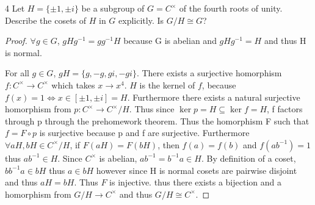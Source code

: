 \documentclass{article}
\begin{document}
\bigskip

\begin{PROB}{4}\label{Problem 4.}
    Let $H = \{\pm 1, \pm i\}$ be a subgroup of $G = C^\times$ of the fourth roots of unity. Describe the cosets of $H$ in $G$ explicitly. Is $G/H \cong G$?
\end{PROB}
\begin{proof}
    $\forall g \in G$, $gHg^{-1} = gg^{-1}H$ because G is abelian and $gHg^{-1} = H$ and thus H is normal.

    For all $g \in G$, $gH = \{g, -g, gi, -gi\}$. There exists a surjective homorphism $f: C^\times \to C^\times$ which takes $x \to x^4$. $H$ is the kernel of $f$, because $f(x) = 1 \iff x \in [\pm 1, \pm i] = H$. Furthermore there exists a natural surjective homorphism from $p: C^\times \to C^\times/H$. Thus since $\ker p = H \subseteq \ker f = H$, f factors through p through the prehomework theorem. Thus the homorphism F such that $f = F \circ p$ is surjective because p and f are surjective. Furthermore $\forall aH, bH \in C^\times/H$, if $F(aH) = F(bH)$, then $f(a) = f(b)$ and $f(ab^{-1}) = 1$ thus $ab^{-1} \in H$. Since $C^\times$ is abelian, $ab^{-1} = b^{-1}a \in H$. By definition of a coset, $bb^{-1}a \in bH$ thus $a \in bH$ however since H is normal cosets are pairwise disjoint and thus $aH = bH$. Thus $F$ is injective. thus there exists a bijection and a homorphism from $G/H \to C^\times$ and thus $G/H \cong C^\times$.
\end{proof}

\bigskip
\end{document}
